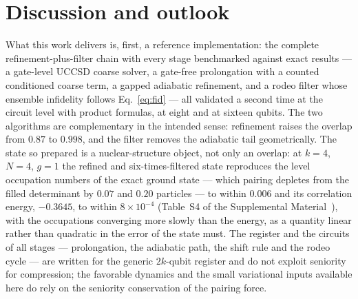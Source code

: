 \documentclass[
  aps,            %
  prc,            %
  reprint,        %
  superscriptaddress,
  floatfix,
  nofootinbib
]{revtex4-2}
\newcommand{\SM}{Supplemental Material~\cite{SM}}
\begin{document}
\section{Discussion and outlook}
\label{sec:discussion}
What this work delivers is, first, a reference implementation: the
complete refinement-plus-filter chain with every stage benchmarked against
exact results --- a gate-level UCCSD coarse solver, a gate-free prolongation
with a counted conditioned coarse term, a gapped adiabatic refinement, and a
rodeo filter whose ensemble infidelity follows Eq.~\eqref{eq:fid} --- all
validated a second time at the circuit level with product formulas, at
eight and at sixteen qubits.  The two algorithms are complementary in the
intended sense: refinement raises the overlap from $0.87$ to $0.998$, and
the filter removes the adiabatic tail geometrically.  The state so prepared
is a nuclear-structure object, not only an overlap: at $k=4$, $N=4$, $g=1$
the refined and six-times-filtered state reproduces the level occupation
numbers of the exact ground state --- which pairing depletes from the
filled determinant by $0.07$ and $0.20$ particles --- to within $0.006$ and
its correlation energy, $-0.3645$, to within $8\times10^{-4}$ (Table~S4 of
the \SM{}), with the occupations converging more slowly than the energy, as
a quantity linear rather than quadratic in the error of the state must.
The register and the
circuits of all stages --- prolongation, the adiabatic path, the shift rule
and the rodeo cycle --- are written for the generic $2k$-qubit register and
do not exploit seniority for compression; the favorable dynamics and the
small variational inputs available here do rely on the seniority
conservation of the pairing force.
\end{document}
